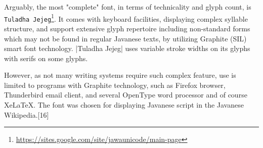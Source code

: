 Arguably, the most "complete" font, in terms of technicality and glyph count, is \texttt{Tuladha Jejeg}\footnote{\url{https://sites.google.com/site/jawaunicode/main-page}}. It comes with keyboard facilities, displaying complex syllable structure, and support extensive glyph repertoire including non-standard forms which may not be found in regular Javanese texts, by utilizing Graphite (SIL) smart font technology. |Tuladha Jejeg| uses variable stroke widths on its glyphs with serifs on some glyphs.

However, as not many writing systems require such complex feature, use is limited to programs with Graphite technology, such as Firefox browser, Thunderbird email client, and several OpenType word processor and of course XeLaTeX. The font was chosen for displaying Javanese script in the Javanese Wikipedia.[16]